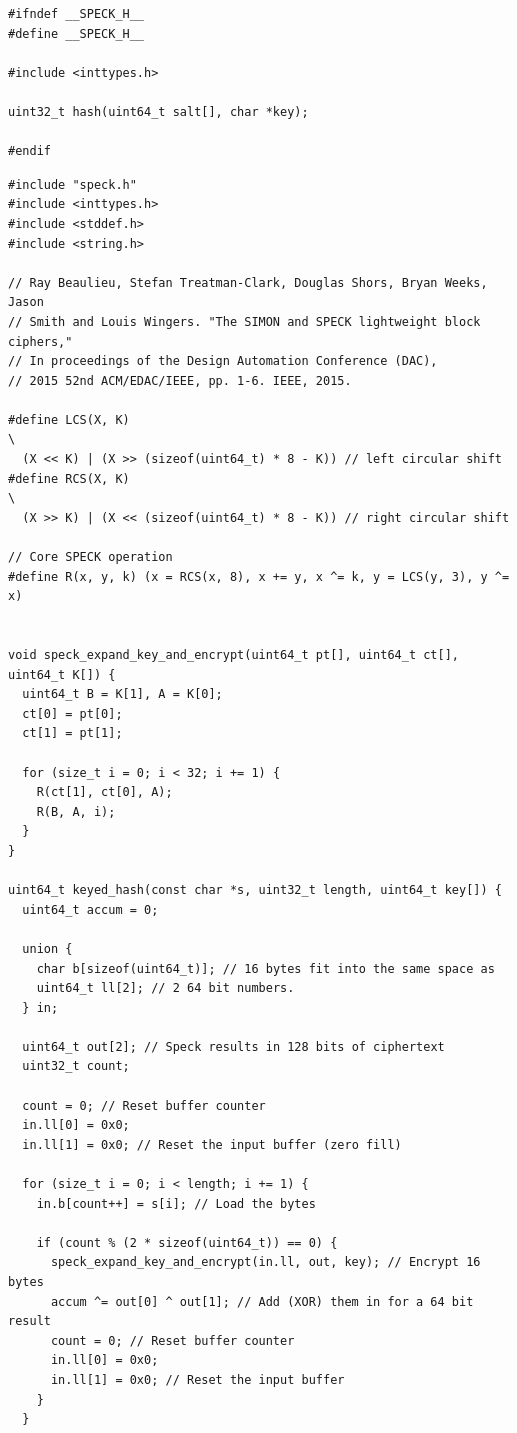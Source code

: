 \documentclass{article}
\begin{document}
\lstset{language=C, style=c99}
\begin{lstlisting}[title=speck.h]
#ifndef __SPECK_H__
#define __SPECK_H__

#include <inttypes.h>

uint32_t hash(uint64_t salt[], char *key);

#endif
\end{lstlisting}
\begin{lstlisting}[title=speck.c]
#include "speck.h"
#include <inttypes.h>
#include <stddef.h>
#include <string.h>

// Ray Beaulieu, Stefan Treatman-Clark, Douglas Shors, Bryan Weeks, Jason
// Smith and Louis Wingers. "The SIMON and SPECK lightweight block ciphers,"
// In proceedings of the Design Automation Conference (DAC),
// 2015 52nd ACM/EDAC/IEEE, pp. 1-6. IEEE, 2015.

#define LCS(X, K)                                                              \
  (X << K) | (X >> (sizeof(uint64_t) * 8 - K)) // left circular shift
#define RCS(X, K)                                                              \
  (X >> K) | (X << (sizeof(uint64_t) * 8 - K)) // right circular shift

// Core SPECK operation
#define R(x, y, k) (x = RCS(x, 8), x += y, x ^= k, y = LCS(y, 3), y ^= x)


void speck_expand_key_and_encrypt(uint64_t pt[], uint64_t ct[], uint64_t K[]) {
  uint64_t B = K[1], A = K[0];
  ct[0] = pt[0];
  ct[1] = pt[1];

  for (size_t i = 0; i < 32; i += 1) {
    R(ct[1], ct[0], A);
    R(B, A, i);
  }
}

uint64_t keyed_hash(const char *s, uint32_t length, uint64_t key[]) {
  uint64_t accum = 0;

  union {
    char b[sizeof(uint64_t)]; // 16 bytes fit into the same space as
    uint64_t ll[2]; // 2 64 bit numbers.
  } in;

  uint64_t out[2]; // Speck results in 128 bits of ciphertext
  uint32_t count;

  count = 0; // Reset buffer counter
  in.ll[0] = 0x0;
  in.ll[1] = 0x0; // Reset the input buffer (zero fill)

  for (size_t i = 0; i < length; i += 1) {
    in.b[count++] = s[i]; // Load the bytes

    if (count % (2 * sizeof(uint64_t)) == 0) {
      speck_expand_key_and_encrypt(in.ll, out, key); // Encrypt 16 bytes
      accum ^= out[0] ^ out[1]; // Add (XOR) them in for a 64 bit result
      count = 0; // Reset buffer counter
      in.ll[0] = 0x0;
      in.ll[1] = 0x0; // Reset the input buffer
    }
  }


\end{lstlisting}
\end{document}
